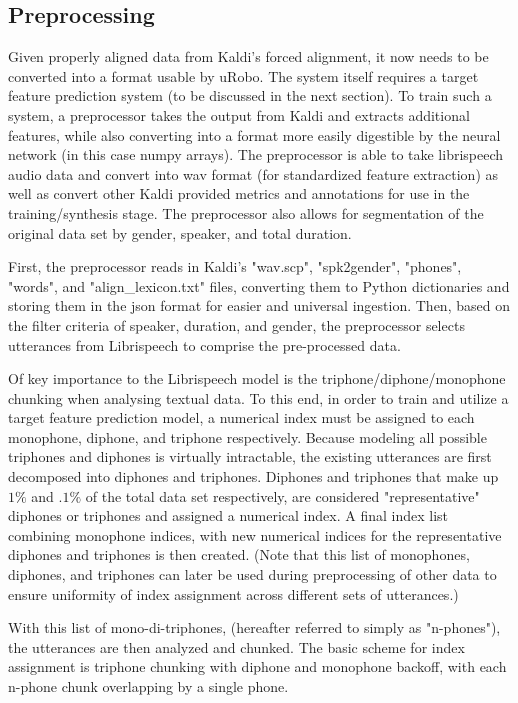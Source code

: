 \documentclass[10pt, journal, compsoc]{IEEEtran}
\begin{document}
\subsection{Preprocessing}
Given properly aligned data from Kaldi's forced alignment, it now needs to be converted into a format usable by uRobo. The system itself requires a target feature prediction system (to be discussed in the next section). To train such a system, a preprocessor takes the output from Kaldi and extracts additional features, while also converting into a format more easily digestible by the neural network (in this case numpy arrays). The preprocessor is able to take librispeech audio data and convert into wav format (for standardized feature extraction) as well as convert other Kaldi provided metrics and annotations for use in the training/synthesis stage. The preprocessor also allows for segmentation of the original data set by gender, speaker, and total duration.\par
First, the preprocessor reads in Kaldi's "wav.scp", "spk2gender", "phones", "words", and "align\_lexicon.txt" files, converting them to Python dictionaries and storing them in the json format for easier and universal ingestion. Then, based on the filter criteria of speaker, duration, and gender, the preprocessor selects utterances from Librispeech to comprise the pre-processed data.\par
Of key importance to the Librispeech model is the triphone/diphone/monophone chunking when analysing textual data. To this end, in order to train and utilize a target feature prediction model, a numerical index must be assigned to each monophone, diphone, and triphone respectively. Because modeling all possible triphones and diphones is virtually intractable, the existing utterances are first decomposed into diphones and triphones. Diphones and triphones that make up $1\%$ and $.1\%$ of the total data set respectively, are considered "representative" diphones or triphones and assigned a numerical index. A final index list combining monophone indices, with new numerical indices for the representative diphones and triphones is then created. (Note that this list of monophones, diphones, and triphones can later be used during preprocessing of other data to ensure uniformity of index assignment across different sets of utterances.)\par
With this list of mono-di-triphones, (hereafter referred to simply as "n-phones"), the utterances are then analyzed and chunked. The basic scheme for index assignment is triphone chunking with diphone and monophone backoff, with each n-phone chunk overlapping by a single phone.\par
\end{document}
